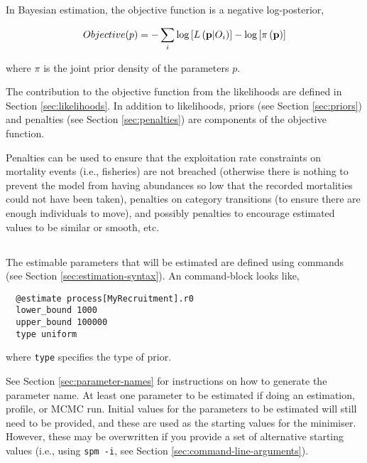 In Bayesian estimation, the objective function is a negative log-posterior,

\begin{equation}
Objective(p)= - \sum\limits_i {\log \left[ {L\left( {{\bf{p}}|O_i } \right)} \right]}  - \log \left[ {\pi \left( {\bf{p}} \right)} \right]
\end{equation}

where $\pi$ is the joint prior density of the parameters $p$.

The contribution to the objective function from the likelihoods are defined in Section \ref{sec:likelihoods}. In addition to likelihoods, priors (see Section \ref{sec:priors}) and penalties (see Section \ref{sec:penalties}) are components of the objective function. 

Penalties can be used to ensure that the exploitation rate constraints on mortality events (i.e., fisheries) are not breached (otherwise there is nothing to prevent the model from having abundances so low that the recorded mortalities could not have been taken), penalties on category transitions (to ensure there are enough individuals to move), and possibly penalties to encourage estimated values to be similar or smooth, etc.

\subsection{\label{sec:estimate-free-parameters}}

The estimable parameters that will be estimated are defined using  commands (see Section \ref{sec:estimation-syntax}). An  command-block looks like,

{\small{\begin{verbatim}
  @estimate process[MyRecruitment].r0
  lower_bound 1000
  upper_bound 100000
  type uniform
\end{verbatim}}}

where \texttt{type} specifies the type of prior.

See Section \ref{sec:parameter-names} for instructions on how to generate the parameter name. At least one parameter to be estimated if doing an estimation, profile, or MCMC run. Initial values for the parameters to be estimated will still need to be provided, and these are used as the starting values for the minimiser. However, these may be overwritten if you provide a set of alternative starting values (i.e., using  \texttt{spm -i}, see Section \ref{sec:command-line-arguments}).

